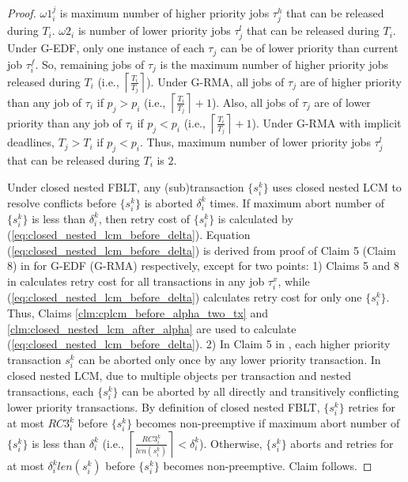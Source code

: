 \documentclass[preprint]{sigplanconf}
\begin{document}
%
\begin{proof}

$\omega1_{i}^{j}$ is maximum number of higher priority jobs $\tau_{j}^{h}$
that can be released during $T_{i}$. $\omega2_{i}$ is number of
lower priority jobs $\tau_{j}^{l}$ that can be released during $T_{i}$.
Under G-EDF, only one instance of each $\tau_{j}$ can be of lower
priority than current job $\tau_{i}^{f}$. So, remaining jobs of $\tau_{j}$
is the maximum number of higher priority jobs released during $T_{i}$
(i.e., $\left\lceil \frac{T_{i}}{T_{j}}\right\rceil $). Under G-RMA,
all jobs of $\tau_{j}$ are of higher priority than any job of $\tau_{i}$
if $p_{j}>p_{i}$ (i.e., $\left\lceil \frac{T_{i}}{T_{j}}\right\rceil +1$).
Also, all jobs of $\tau_{j}$ are of lower priority than any job of
$\tau_{i}$ if $p_{j}<p_{i}$ (i.e., $\left\lceil \frac{T_{i}}{T_{j}}\right\rceil +1$).
Under G-RMA with implicit deadlines, $T_{j}>T_{i}$ if $p_{j}<p_{i}$.
Thus, maximum number of lower priority jobs $\tau_{j}^{l}$ that can
be released during $T_{i}$ is $2$.

Under closed nested FBLT, any (sub)transaction $\{s_{i}^{k}\}$ uses
closed nested LCM to resolve conflicts before $\{s_{i}^{k}\}$ is
aborted $\delta_{i}^{k}$ times. If maximum abort number of $\{s_{i}^{k}\}$
is less than $\delta_{i}^{k}$, then retry cost of $\{s_{i}^{k}\}$
is calculated by (\ref{eq:closed_nested_lcm_before_delta}). Equation
(\ref{eq:closed_nested_lcm_before_delta}) is derived from proof of
Claim 5 (Claim 8) in \cite{lcmdac2012} for G-EDF (G-RMA) respectively,
except for two points: 1) Claims 5 and 8 in \cite{lcmdac2012} calculates
retry cost for all transactions in any job $\tau_{i}^{x}$, while
(\ref{eq:closed_nested_lcm_before_delta}) calculates retry cost for
only one $\{s_{i}^{k}\}$. Thus, Claims \ref{clm:cplcm_before_alpha_two_tx}
and \ref{clm:closed_nested_lcm_after_alpha} are used to calculate
(\ref{eq:closed_nested_lcm_before_delta}). 2) In Claim 5 in \cite{lcmdac2012},
each higher priority transaction $s_{i}^{k}$ can be aborted only
once by any lower priority transaction. In closed nested LCM, due
to multiple objects per transaction and nested transactions, each
$\{s_{i}^{k}\}$ can be aborted by all directly and transitively conflicting
lower priority transactions. By definition of closed nested FBLT,
$\{s_{i}^{k}\}$ retries for at most $RC3_{i}^{k}$ before $\{s_{i}^{k}\}$
becomes non-preemptive if maximum abort number of $\{s_{i}^{k}\}$
is less than $\delta_{i}^{k}$ (i.e., $\left\lceil \frac{RC3_{i}^{k}}{len\left(s_{i}^{k}\right)}\right\rceil <\delta_{i}^{k}$).
Otherwise, $\{s_{i}^{k}\}$ aborts and retries for at most $\delta_{i}^{k}len\left(s_{i}^{k}\right)$
before $\{s_{i}^{k}\}$ becomes non-preemptive. Claim follows.
%
\end{proof}
\end{document}
